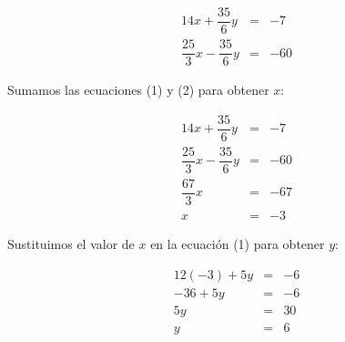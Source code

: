 \documentclass[12pt,addpoints]{repaso}
\begin{document}
\begin{questions}
{\begin{solutionbox}{11.5cm}
            \begin{eqnarray}
                14x + \dfrac{35}{6}y & = & -7 \nonumber\\
                \dfrac{25}{3}x - \dfrac{35}{6}y & = & -60 \nonumber
            \end{eqnarray}

            Sumamos las ecuaciones (1) y (2) para obtener $x$:

            \begin{eqnarray}
                14x + \dfrac{35}{6}y & = & -7 \nonumber\\
                \dfrac{25}{3}x - \dfrac{35}{6}y & = & -60 \nonumber\\ \hline
                \dfrac{67}{3}x & = & -67 \nonumber\\
                x & = & -3 \nonumber
            \end{eqnarray}

            Sustituimos el valor de $x$ en la ecuación (1) para obtener $y$:

            \begin{eqnarray}
                12(-3) + 5y & = & -6 \nonumber\\
                -36 + 5y & = & -6 \nonumber\\
                5y & = & 30 \nonumber\\
                y & = & 6 \nonumber
            \end{eqnarray}
        \end{solutionbox}
    }

\end{questions}
\end{document}
